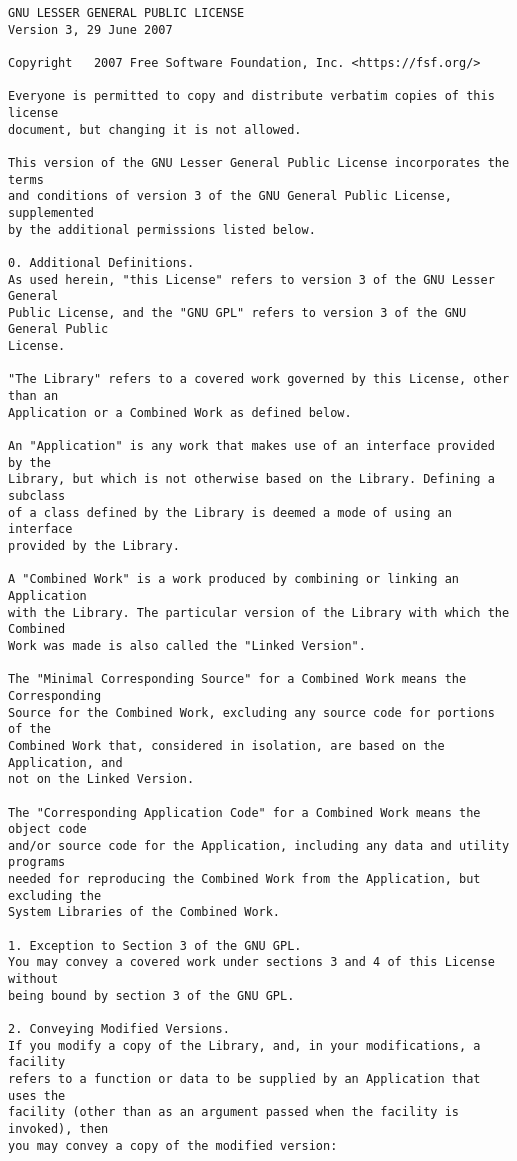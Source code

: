 \begin{verbatim}
GNU LESSER GENERAL PUBLIC LICENSE
Version 3, 29 June 2007

Copyright   2007 Free Software Foundation, Inc. <https://fsf.org/>

Everyone is permitted to copy and distribute verbatim copies of this license
document, but changing it is not allowed.

This version of the GNU Lesser General Public License incorporates the terms
and conditions of version 3 of the GNU General Public License, supplemented
by the additional permissions listed below.

0. Additional Definitions.
As used herein, "this License" refers to version 3 of the GNU Lesser General
Public License, and the "GNU GPL" refers to version 3 of the GNU General Public
License.

"The Library" refers to a covered work governed by this License, other than an
Application or a Combined Work as defined below.

An "Application" is any work that makes use of an interface provided by the
Library, but which is not otherwise based on the Library. Defining a subclass
of a class defined by the Library is deemed a mode of using an interface
provided by the Library.

A "Combined Work" is a work produced by combining or linking an Application
with the Library. The particular version of the Library with which the Combined
Work was made is also called the "Linked Version".

The "Minimal Corresponding Source" for a Combined Work means the Corresponding
Source for the Combined Work, excluding any source code for portions of the
Combined Work that, considered in isolation, are based on the Application, and
not on the Linked Version.

The "Corresponding Application Code" for a Combined Work means the object code
and/or source code for the Application, including any data and utility programs
needed for reproducing the Combined Work from the Application, but excluding the
System Libraries of the Combined Work.

1. Exception to Section 3 of the GNU GPL.
You may convey a covered work under sections 3 and 4 of this License without
being bound by section 3 of the GNU GPL.

2. Conveying Modified Versions.
If you modify a copy of the Library, and, in your modifications, a facility
refers to a function or data to be supplied by an Application that uses the
facility (other than as an argument passed when the facility is invoked), then
you may convey a copy of the modified version:


\end{verbatim}
